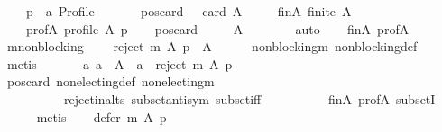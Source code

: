\begin{isabellebody}
\ \ \ \ p\ {\isacharcolon}{\kern0pt}{\isacharcolon}{\kern0pt}\ {\isachardoublequoteopen}{\isacharprime}{\kern0pt}a\ Profile{\isachardoublequoteclose}\isanewline
\ \ \isamarkupfalse%
\isanewline
\ \ \ \ pos{\isacharunderscore}{\kern0pt}card{\isacharcolon}{\kern0pt}\ {\isachardoublequoteopen}{}\ {\isasymle}\ card\ A{\isachardoublequoteclose}\ \isanewline
\ \ \ \ fin{\isacharunderscore}{\kern0pt}A{\isacharcolon}{\kern0pt}\ {\isachardoublequoteopen}finite\ A{\isachardoublequoteclose}\ \isanewline
\ \ \ \ prof{\isacharunderscore}{\kern0pt}A{\isacharcolon}{\kern0pt}\ {\isachardoublequoteopen}profile\ A\ p{\isachardoublequoteclose}\isanewline
\ \ \isamarkupfalse%
\ pos{\isacharunderscore}{\kern0pt}card\ \isamarkupfalse%
\isanewline
\ \ \ \ {\isachardoublequoteopen}A\ {\isasymnoteq}\ {\isacharbraceleft}{\kern0pt}{\isacharbraceright}{\kern0pt}{\isachardoublequoteclose}\isanewline
\ \ \ \ \isamarkupfalse%
\ auto\isanewline
\ \ \isamarkupfalse%
\ fin{\isacharunderscore}{\kern0pt}A\ prof{\isacharunderscore}{\kern0pt}A\ \isamarkupfalse%
\ m{\isacharunderscore}{\kern0pt}non{\isacharunderscore}{\kern0pt}blocking{\isacharcolon}{\kern0pt}\isanewline
\ \ \ \ {\isachardoublequoteopen}reject\ m\ A\ p\ {\isasymnoteq}\ A{\isachardoublequoteclose}\isanewline
\ \ \ \ \isamarkupfalse%
\ non{\isacharunderscore}{\kern0pt}blocking{\isacharunderscore}{\kern0pt}m\ non{\isacharunderscore}{\kern0pt}blocking{\isacharunderscore}{\kern0pt}def\isanewline
\ \ \ \ \isamarkupfalse%
\ metis\isanewline
\ \ \isamarkupfalse%
\isanewline
\ \ \ \ {\isachardoublequoteopen}{\isasymexists}a{\isachardot}{\kern0pt}\ a\ {\isasymin}\ A\ {\isasymand}\ a\ {\isasymnotin}\ reject\ m\ A\ p{\isachardoublequoteclose}\isanewline
\ \ \ \ \isamarkupfalse%
\ pos{\isacharunderscore}{\kern0pt}card\ non{\isacharunderscore}{\kern0pt}electing{\isacharunderscore}{\kern0pt}def\ non{\isacharunderscore}{\kern0pt}electing{\isacharunderscore}{\kern0pt}m\isanewline
\ \ \ \ \ \ \ \ \ \ reject{\isacharunderscore}{\kern0pt}in{\isacharunderscore}{\kern0pt}alts\ subset{\isacharunderscore}{\kern0pt}antisym\ subset{\isacharunderscore}{\kern0pt}iff\isanewline
\ \ \ \ \ \ \ \ \ \ fin{\isacharunderscore}{\kern0pt}A\ prof{\isacharunderscore}{\kern0pt}A\ subsetI\isanewline
\ \ \ \ \isamarkupfalse%
\ metis\isanewline
\ \ \isamarkupfalse%
\ {\isachardoublequoteopen}defer\ m\ A\ p\ {\isasymnoteq}\ {\isacharbraceleft}{\kern0pt}{\isacharbraceright}{\kern0pt}{\isachardoublequoteclose}\isanewline

\end{isabellebody}
